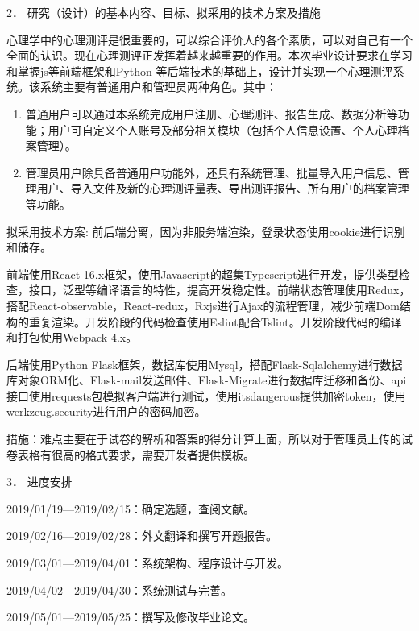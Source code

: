 \documentclass[a4paper]{ctexart}
\begin{document}
{\large \fangsong 
\begin{flushleft}
2．	研究（设计）的基本内容、目标、拟采用的技术方案及措施
\end{flushleft}

心理学中的心理测评是很重要的，可以综合评价人的各个素质，可以对自己有一个全面的认识。现在心理测评正发挥着越来越重要的作用。本次毕业设计要求在学习和掌握js等前端框架和Python 等后端技术的基础上，设计并实现一个心理测评系统。该系统主要有普通用户和管理员两种角色。其中：

\begin{enumerate}
	\item  普通用户可以通过本系统完成用户注册、心理测评、报告生成、数据分析等功能；用户可自定义个人账号及部分相关模块（包括个人信息设置、个人心理档案管理）。
	\item 管理员用户除具备普通用户功能外，还具有系统管理、批量导入用户信息、管理用户、导入文件及新的心理测评量表、导出测评报告、所有用户的档案管理等功能。
\end{enumerate}


拟采用技术方案: 前后端分离，因为非服务端渲染，登录状态使用cookie进行识别和储存。

前端使用React 16.x框架，使用Javascript的超集Typescript进行开发，提供类型检查，接口，泛型等编译语言的特性，提高开发稳定性。前端状态管理使用Redux，搭配React-observable，React-redux，Rxjs进行Ajax的流程管理，减少前端Dom结构的重复渲染。开发阶段的代码检查使用Eslint配合Tslint。开发阶段代码的编译和打包使用Webpack 4.x。

后端使用Python Flask框架，数据库使用Mysql，搭配Flask-Sqlalchemy进行数据库对象ORM化、Flask-mail发送邮件、Flask-Migrate进行数据库迁移和备份、api接口使用requests包模拟客户端进行测试，使用itsdangerous提供加密token，使用werkzeug.security进行用户的密码加密。

措施：难点主要在于试卷的解析和答案的得分计算上面，所以对于管理员上传的试卷表格有很高的格式要求，需要开发者提供模板。

}

\begin{flushleft}
3．	进度安排
\end{flushleft}

2019/01/19—2019/02/15：确定选题，查阅文献。

2019/02/16—2019/02/28：外文翻译和撰写开题报告。

2019/03/01—2019/04/01：系统架构、程序设计与开发。

2019/04/02—2019/04/30：系统测试与完善。

2019/05/01—2019/05/25：撰写及修改毕业论文。
\end{document}

